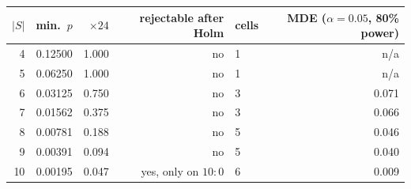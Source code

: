 {\scriptsize\setlength{\tabcolsep}{2.5pt}
\begin{tabular}{@{}rrrrlr@{}}
\toprule
$|S|$ & min.\ $p$ & $\times 24$ & rejectable after Holm & cells & MDE ($\alpha{=}0.05$, 80\% power) \\
\midrule
4 & 0.12500 & 1.000 & no & 1 & n/a \\
5 & 0.06250 & 1.000 & no & 1 & n/a \\
6 & 0.03125 & 0.750 & no & 3 & 0.071 \\
7 & 0.01562 & 0.375 & no & 3 & 0.066 \\
8 & 0.00781 & 0.188 & no & 5 & 0.046 \\
9 & 0.00391 & 0.094 & no & 5 & 0.040 \\
10 & 0.00195 & 0.047 & yes, only on $10{:}0$ & 6 & 0.009 \\
\bottomrule
\end{tabular}
}
